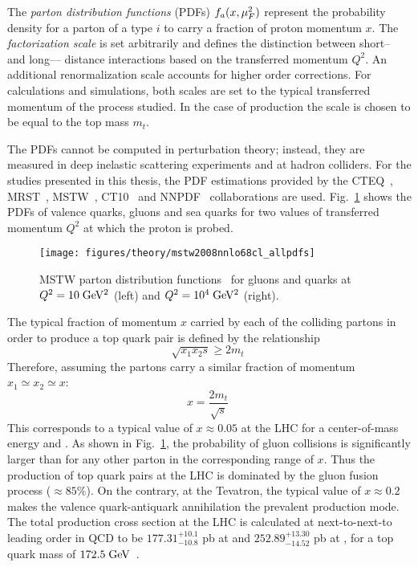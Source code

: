 The {\it parton distribution functions} (PDFs) $f_a(x,\mu_F^2{})$
represent the probability density for a parton of a type $i$ to carry
a fraction of proton momentum $x$. The {\it factorization scale}
\factscale{} is set arbitrarily and defines the distinction between
short-- and long--- distance interactions based on the transferred momentum
$Q^2$. An additional renormalization scale \renormscale{} accounts for higher
order corrections. For calculations and simulations, both scales are
set to the typical transferred momentum of the process studied. In the case of
\ttbar{} production the scale is chosen to be equal to the top mass $m_t$.
  
The PDFs cannot be computed in perturbation theory; instead, they are
measured in deep inelastic scattering experiments and at hadron colliders.
For the studies presented in this thesis, the PDF estimations
provided by the CTEQ~\cite{cteq6}, MRST~\cite{mrst}, MSTW~\cite{mstw}, CT10~\cite{ct10}
and NNPDF~\cite{nnpdf} collaborations are used. Fig.~\ref{fig:pdfs}
shows the PDFs of valence quarks, gluons and sea quarks for two values
of transferred momentum $Q^2$ at which the proton is probed. 

\begin{figure}[!htb]\centering
  \texttt{[image: figures/theory/mstw2008nnlo68cl\_allpdfs]}
  \caption{MSTW parton distribution functions~\cite{ct10} for gluons
    and quarks at $Q^2=10\; \mathrm{GeV}{}^2$ (left) and $Q^2=10^4\; \mathrm{GeV}{}^2$ (right).}
  \label{fig:pdfs}
\end{figure}

The typical fraction of momentum $x$ carried by each of the colliding
partons in order to produce a top quark pair is defined by the
relationship
\begin{equation}
\sqrt{x_1x_2s}\geq{}2m_t\phantom{.}
\end{equation}
Therefore, assuming the partons carry a similar fraction of momentum
$x_1\simeq{}x_2\simeq{}x$:
\begin{equation}
x=\frac{2m_t}{\sqrt{s}}
\phantom{.}
\end{equation}
This corresponds to a typical value of $x\approx{}0.05$ at the LHC for
a center-of-mass energy \seventev{} and \eighttev{}. As shown in
Fig.~\ref{fig:pdfs}, the probability of gluon collisions is
significantly larger than for any other parton in the corresponding
range of $x$. Thus the production of top quark pairs at the LHC is
dominated by the gluon fusion process ($\approx{}85\%$). On the
contrary, at the Tevatron, the typical value of $x\approx{}0.2$ makes
the valence quark-antiquark annihilation the prevalent \ttbar{}
production mode.
The total \ttbar{} production cross section at the LHC is calculated
at next-to-next-to leading order in
QCD to be
$177.31^{+10.1}_{-10.8}$ pb at \seventev{} and
$252.89^{+13.30}_{-14.52}$ pb at \eighttev{}, for a top quark mass of
$172.5 \; \mathrm{GeV}{}$~\cite{ttxs1,ttxs2,ttxs3,ttxs4,ttxs5,ttxs6,ttxs7}.
 
